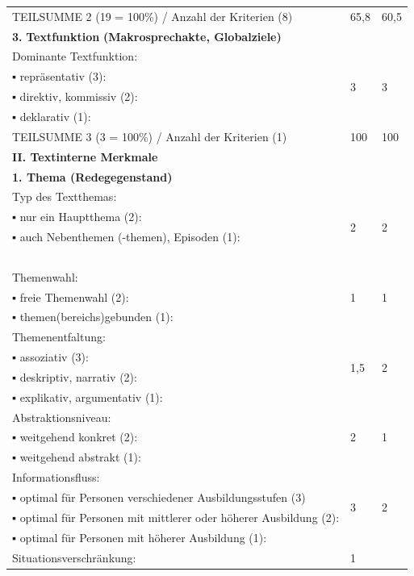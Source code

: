 \documentclass[
  letterpaper,
]{scrbook}
\begin{document}
\begin{longtable}[]{@{}lll@{}}
{TEILSUMME 2 (19 = 100\%) / {Anzahl} der {Kriterien} (8)} & {65,8} &
{60,5} \\
\textbf{{3.}}{ {\textbf{Textfunktion}} \textbf{({Makrosprechakte},
{Globalziele})}} & {~} & {~} \\
{Dominante {Textfunktion}:} & \multirow{4}{*}{{3}} &
\multirow{4}{*}{{3}} \\
{▪ {repräsentativ} (3):} \\
{▪ direktiv, {kommissiv} (2):} \\
{▪ {deklarativ} (1):} \\
{TEILSUMME 3 (3 = 100\%) / {Anzahl} der {Kriterien} (1)} & {100} &
{100} \\
\textbf{{II. {Textinterne} {Merkmale}}} & {~} & {~} \\
\textbf{{1. {Thema} ({Redegegenstand})}} & {~} & {~} \\
{{Typ}}{ des {Textthemas}:} & \multirow{4}{*}{{2}} &
\multirow{4}{*}{{2}} \\
{▪ {nur} {ein} {Hauptthema} (2):} \\
{▪ {auch} {Nebenthemen} (-{themen}), {Episoden} (1):} \\
{~} \\
{{Themenwahl}}{:} & \multirow{3}{*}{{1}} & \multirow{3}{*}{{1}} \\
{▪ {freie} {Themenwahl} (2):} \\
{▪ {themen}({bereichs}){gebunden} (1):} \\
{{Themenentfaltung}}{:} & \multirow{4}{*}{{1,5}} &
\multirow{4}{*}{{2}} \\
{▪ {assoziativ} (3):} \\
{▪ {deskriptiv}, {narrativ} (2):} \\
{▪ {explikativ}, {argumentativ} (1):} \\
{{Abstraktionsniveau}}{:} & \multirow{3}{*}{{2}} &
\multirow{3}{*}{{1}} \\
{▪ {weitgehend} {konkret} (2):} \\
{▪ {weitgehend} {abstrakt} (1):} \\
{{Informationsfluss}}{:} & \multirow{4}{*}{{3}} &
\multirow{4}{*}{{2}} \\
{▪ {optimal} {für} {Personen} {verschiedener} {Ausbildungsstufen}
(3)} \\
{▪ {optimal} {für} {Personen} mit {mittlerer} oder {höherer}
{Ausbildung} (2):} \\
{▪ {optimal} {für} {Personen} mit {höherer} {Ausbildung} (1):} \\
{{Situationsverschränkung}}{:} & \multirow{7}{*}{{1}} &

\end{longtable}
\end{document}
